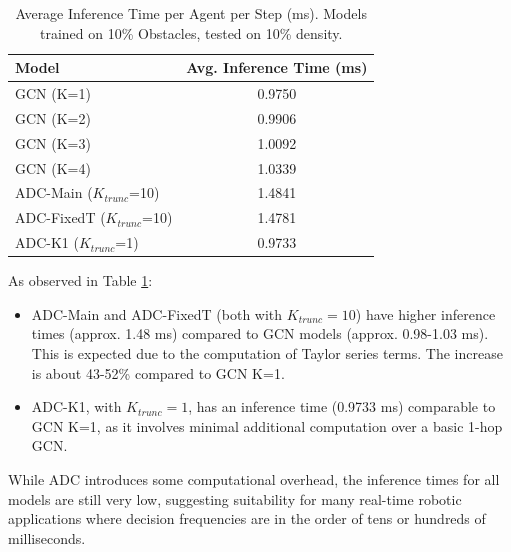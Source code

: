 \begin{table}[htbp]
    \centering
    \caption{Average Inference Time per Agent per Step (ms). Models trained on 10\% Obstacles, tested on 10\% density.}
    \label{tab:inference_time_detailed}
    \begin{tabular}{lc}
        \toprule
        Model & Avg. Inference Time (ms) \\
        \midrule
        GCN (K=1) & 0.9750 \\
        GCN (K=2) & 0.9906 \\
        GCN (K=3) & 1.0092 \\
        GCN (K=4) & 1.0339 \\
        \midrule
        ADC-Main ($K_{trunc}$=10) & 1.4841 \\
        ADC-FixedT ($K_{trunc}$=10) & 1.4781 \\
        ADC-K1 ($K_{trunc}$=1) & 0.9733 \\
        \bottomrule
    \end{tabular}
\end{table}
As observed in Table \ref{tab:inference_time_detailed}:
\begin{itemize}
    \item ADC-Main and ADC-FixedT (both with $K_{trunc}=10$) have higher inference times (approx. 1.48 ms) compared to GCN models (approx. 0.98-1.03 ms). This is expected due to the computation of Taylor series terms. The increase is about 43-52\% compared to GCN K=1.
    \item ADC-K1, with $K_{trunc}=1$, has an inference time (0.9733 ms) comparable to GCN K=1, as it involves minimal additional computation over a basic 1-hop GCN.
\end{itemize}
While ADC introduces some computational overhead, the inference times for all models are still very low, suggesting suitability for many real-time robotic applications where decision frequencies are in the order of tens or hundreds of milliseconds.
